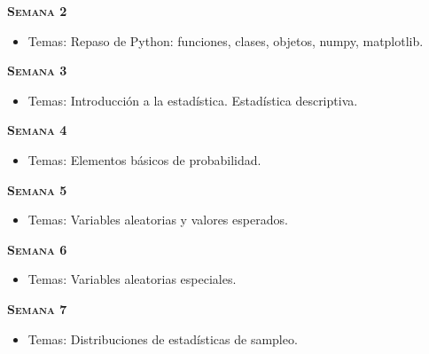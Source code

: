 \documentclass[letterpaper,10pt,onecolumn]{article}
\begin{document}
\noindent\textbf{\textsc{Semana 2}} \\[-0.5cm]
\begin{itemize}
\item Temas: 
Repaso de Python: funciones, clases, objetos, numpy, matplotlib. \\[-0.6cm] 
\end{itemize}

\noindent\textbf{\textsc{Semana 3}}\\[-0.5cm]
\begin{itemize}
\item Temas:  
Introducci\'on a la estad\'istica. Estad\'istica descriptiva.
\\[-0.6cm]  
\end{itemize}

\noindent\textbf{\textsc{Semana 4}}\\[-0.5cm]
\begin{itemize}
\item Temas:  Elementos b\'asicos de probabilidad. 
\\[-0.6cm] 
\end{itemize}

\noindent\textbf{\textsc{Semana 5}}\\[-0.5cm]
\begin{itemize}
\item Temas: Variables aleatorias y valores esperados.
  \\[-0.6cm] 
\end{itemize}


\noindent\textbf{\textsc{Semana 6}}\\[-0.5cm]
\begin{itemize}
\item Temas:  Variables aleatorias especiales. \\[-0.6cm]  
\end{itemize}


\noindent\textbf{\textsc{Semana 7}}\\[-0.5cm]
\begin{itemize}
\item Temas: Distribuciones de estad\'isticas de sampleo.
\\[-0.6cm] 
\end{itemize}
\end{document}
